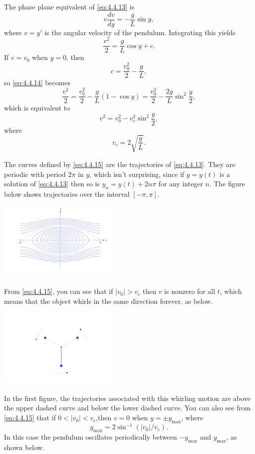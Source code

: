 \documentclass{ximera}
\begin{document}
\begin{example}
The phase plane equivalent of \eqref{eq:4.4.13} is
$$
v\frac{dv}{dy}=-\frac{g}{L}\sin y,
$$
where $v=y'$ is the angular velocity of the pendulum. Integrating this
yields
\begin{equation} \label{eq:4.4.14}
\frac{v^2}{2}=\frac{g}{L}\cos y+c.
\end{equation}
If $v=v_0$ when $y=0$, then
$$
c=\frac{v_0^2}{2}-\frac{g}{L},
$$
so \eqref{eq:4.4.14} becomes
$$
\frac{v^2}{2}=\frac{v_0^2}{2}-\frac{g}{L}(1-\cos y)
=\frac{v_0^2}{2}-\frac{2g}{L}\sin^2\frac{y}{2},
$$
which is equivalent to
\begin{equation} \label{eq:4.4.15}
v^2=v_0^2-v_c^2\sin^2\frac{y}{2},
\end{equation}
 where
$$
v_c=2\sqrt{\frac{g}{L}}.
$$

The curves defined by \eqref{eq:4.4.15} are the trajectories of
\eqref{eq:4.4.13}. They are periodic with period $2\pi$ in $y$, which isn't
 surprising, since if $y=y(t)$ is a solution of \eqref{eq:4.4.13} then
so is $y_n=y(t)+2n\pi$ for any integer $n$. The figure below 
shows trajectories over the interval $[-\pi,\pi]$. 

\begin{image}
 \includegraphics[height=1.5in]{fig040407.jpg} 
\end{image}


From \eqref{eq:4.4.15},
you can see that if $|v_0|>v_c$ then $v$ is nonzero for all $t$, which
means that the object whirls in the same direction forever, as below. 

\begin{image}
 \includegraphics[height=1.5in]{fig040408.jpg} 
\end{image}


In the first figure, the trajectories associated with this
whirling motion are above the upper dashed curve and below the lower
dashed curve. You can also see from
\eqref{eq:4.4.15} that if $0<|v_0|<v_c$,then $v=0$ when $y=\pm y_{\max}$,
where
$$
y_{\max}=2\sin^{-1}(|v_0|/v_c).
$$
In this case the pendulum oscillates periodically between $-y_{\max}$
and $y_{\max}$, as shown below. 


\end{example}
\end{document}

